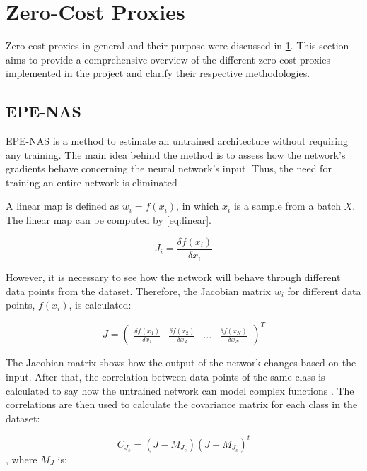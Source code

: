 \section{Zero-Cost Proxies}\label{zcproxies}

Zero-cost proxies in general and their purpose were discussed in \cref{zcproxies}. This section aims to provide a comprehensive overview of the different zero-cost proxies implemented in the project and clarify their respective methodologies.


\subsection{EPE-NAS}
EPE-NAS is a method to estimate an untrained architecture without requiring any training. The main idea behind the method is to assess how the network's gradients behave concerning the neural network's input. Thus, the need for training an entire network is eliminated \autocite{lopes2021epe}. 

A linear map is defined as $w_i = f(x_i)$, in which $x_i$ is a sample from a batch $X$. The linear map can be computed by \cref{eq:linear}. 

\begin{equation}
    J_i = \frac{\delta f(x_i)}{\delta x_i}
    \label{eq:linear}
\end{equation}

However, it is necessary to see how the network will behave through different data points from the dataset. Therefore, the Jacobian matrix $w_i$ for different data points, $f(x_i)$, is calculated:

\begin{equation}
J = \begin{pmatrix}
\frac{\delta f(x_1)}{\delta x_1} & \frac{\delta f(x_2)}{\delta x_2} & \dots & \frac{\delta f(x_N)}{\delta x_N} 
 \end{pmatrix}^T
\end{equation}

The Jacobian matrix shows how the output of the network changes based on the input. After that, the correlation between data points of the same class is calculated to say how the untrained network can model complex functions \autocite{lopes2021epe}. The correlations are then used to calculate the covariance matrix for each class in the dataset:

\begin{equation}
    C_{J_c} = (J - M_{J_c})(J-M_{J_c})^t
\end{equation}
, where $M_J$ is:

